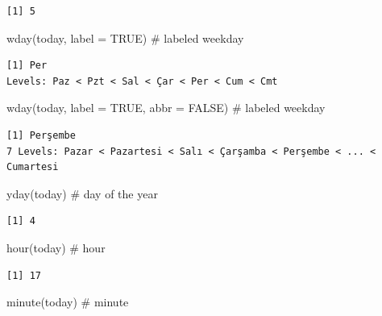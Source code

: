 \documentclass[
  letterpaper,
  DIV=11,
  numbers=noendperiod]{scrreprt}
\newenvironment{Shaded}{\begin{snugshade}}{\end{snugshade}}
\newcommand{\AttributeTok}[1]{\textcolor[rgb]{0.40,0.45,0.13}{#1}}
\newcommand{\CommentTok}[1]{\textcolor[rgb]{0.37,0.37,0.37}{#1}}
\newcommand{\ConstantTok}[1]{\textcolor[rgb]{0.56,0.35,0.01}{#1}}
\newcommand{\FunctionTok}[1]{\textcolor[rgb]{0.28,0.35,0.67}{#1}}
\newcommand{\NormalTok}[1]{\textcolor[rgb]{0.00,0.23,0.31}{#1}}
\begin{document}
\begin{verbatim}
[1] 5
\end{verbatim}

\begin{Shaded}
\begin{Highlighting}[]
\FunctionTok{wday}\NormalTok{(today, }\AttributeTok{label =} \ConstantTok{TRUE}\NormalTok{) }\CommentTok{\# labeled weekday}
\end{Highlighting}
\end{Shaded}

\begin{verbatim}
[1] Per
Levels: Paz < Pzt < Sal < Çar < Per < Cum < Cmt
\end{verbatim}

\begin{Shaded}
\begin{Highlighting}[]
\FunctionTok{wday}\NormalTok{(today, }\AttributeTok{label =} \ConstantTok{TRUE}\NormalTok{, }\AttributeTok{abbr =} \ConstantTok{FALSE}\NormalTok{) }\CommentTok{\# labeled weekday}
\end{Highlighting}
\end{Shaded}

\begin{verbatim}
[1] Perşembe
7 Levels: Pazar < Pazartesi < Salı < Çarşamba < Perşembe < ... < Cumartesi
\end{verbatim}

\begin{Shaded}
\begin{Highlighting}[]
\FunctionTok{yday}\NormalTok{(today) }\CommentTok{\# day of the year}
\end{Highlighting}
\end{Shaded}

\begin{verbatim}
[1] 4
\end{verbatim}

\begin{Shaded}
\begin{Highlighting}[]
\FunctionTok{hour}\NormalTok{(today) }\CommentTok{\# hour}
\end{Highlighting}
\end{Shaded}

\begin{verbatim}
[1] 17
\end{verbatim}

\begin{Shaded}
\begin{Highlighting}[]
\FunctionTok{minute}\NormalTok{(today) }\CommentTok{\# minute}
\end{Highlighting}
\end{Shaded}
\end{document}
